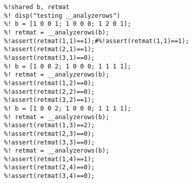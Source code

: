 \begin{verbatim}
%!shared b, retmat
%! disp("testing __analyzerows")
%! b = [1 0 0 1; 1 0 0 0; 1 2 0 1];
%! retmat = __analyzerows(b);
%!assert(retmat(1,1)==1);#%!assert(retmat(1,1)==1);
%!assert(retmat(2,1)==1);
%!assert(retmat(3,1)==0);
%! b = [1 0 0 2; 1 0 0 0; 1 1 1 1];
%! retmat = __analyzerows(b);
%!assert(retmat(1,2)==0);
%!assert(retmat(2,2)==0);
%!assert(retmat(3,2)==1);
%! b = [1 0 0 2; 1 0 0 0; 1 1 1 1];
%! retmat = __analyzerows(b);
%!assert(retmat(1,3)==2);
%!assert(retmat(2,3)==0);
%!assert(retmat(3,3)==0);
%! retmat = __analyzerows(b);
%!assert(retmat(1,4)==1);
%!assert(retmat(2,4)==0);
%!assert(retmat(3,4)==0);
\end{verbatim}
